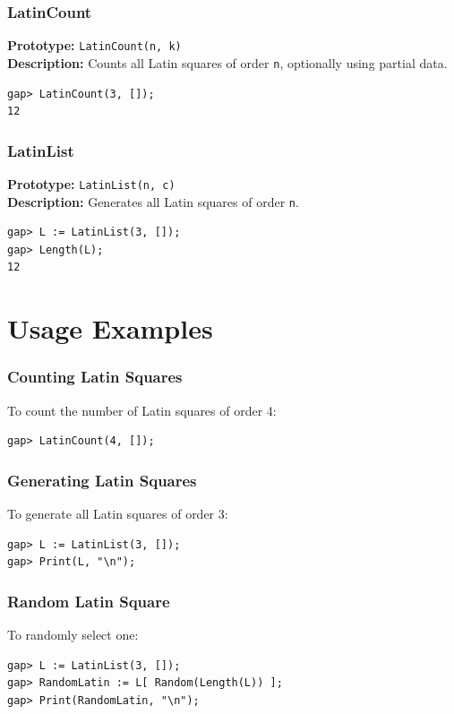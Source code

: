 \documentclass{beamer}
\begin{document}
\begin{frame}[fragile]
\frametitle{LatinCount}
\textbf{Prototype:} \texttt{LatinCount(n, k)}\\
\textbf{Description:} Counts all Latin squares of order \texttt{n}, optionally using partial data.
\begin{lstlisting}
gap> LatinCount(3, []);
12
\end{lstlisting}
\end{frame}

\begin{frame}[fragile]
\frametitle{LatinList}
\textbf{Prototype:} \texttt{LatinList(n, c)}\\
\textbf{Description:} Generates all Latin squares of order \texttt{n}.
\begin{lstlisting}
gap> L := LatinList(3, []);
gap> Length(L);
12
\end{lstlisting}
\end{frame}

\section{Usage Examples}
\begin{frame}[fragile]
\frametitle{Counting Latin Squares}
To count the number of Latin squares of order 4:
\begin{lstlisting}
gap> LatinCount(4, []);
\end{lstlisting}
\end{frame}

\begin{frame}[fragile]
\frametitle{Generating Latin Squares}
To generate all Latin squares of order 3:
\begin{lstlisting}
gap> L := LatinList(3, []);
gap> Print(L, "\n");
\end{lstlisting}
\end{frame}

\begin{frame}[fragile]
\frametitle{Random Latin Square}
To randomly select one:
\begin{lstlisting}
gap> L := LatinList(3, []);
gap> RandomLatin := L[ Random(Length(L)) ];
gap> Print(RandomLatin, "\n");
\end{lstlisting}
\end{frame}
\end{document}
